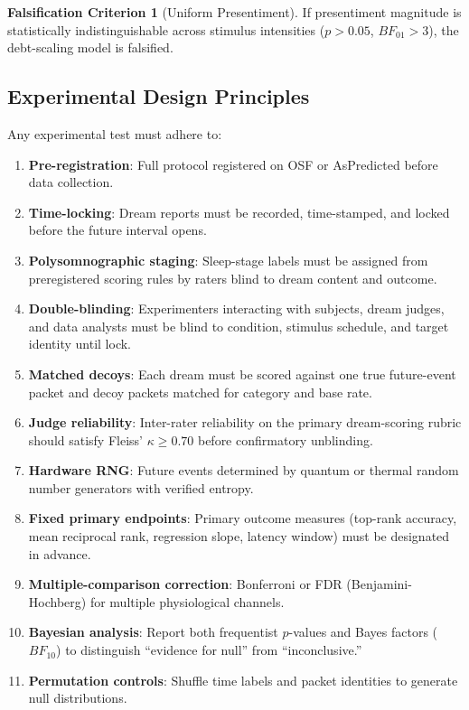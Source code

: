 \documentclass[11pt, a4paper]{article}
\theoremstyle{definition}
\newtheorem{falsifier}[theorem]{Falsification Criterion}
\theoremstyle{remark}
\begin{document}
\begin{falsifier}[Uniform Presentiment]\label{fal:uniform}
If presentiment magnitude is statistically indistinguishable across
stimulus intensities ($p > 0.05$, $BF_{01} > 3$), the debt-scaling
model is falsified.
\end{falsifier}

\subsection{Experimental Design Principles}

Any experimental test must adhere to:
\begin{enumerate}
    \item \textbf{Pre-registration}: Full protocol registered on
    OSF or AsPredicted before data collection.
    \item \textbf{Time-locking}: Dream reports must be recorded,
    time-stamped, and locked before the future interval opens.
    \item \textbf{Polysomnographic staging}: Sleep-stage labels must be
    assigned from preregistered scoring rules by raters blind to dream
    content and outcome.
    \item \textbf{Double-blinding}: Experimenters interacting with
    subjects, dream judges, and data analysts must be blind to
    condition, stimulus schedule, and target identity until lock.
    \item \textbf{Matched decoys}: Each dream must be scored against
    one true future-event packet and decoy packets matched for
    category and base rate.
    \item \textbf{Judge reliability}: Inter-rater reliability on the
    primary dream-scoring rubric should satisfy
    Fleiss' $\kappa \geq 0.70$ before confirmatory unblinding.
    \item \textbf{Hardware RNG}: Future events determined by quantum
    or thermal random number generators with verified entropy.
    \item \textbf{Fixed primary endpoints}: Primary outcome measures
    (top-rank accuracy, mean reciprocal rank, regression slope,
    latency window) must be designated in advance.
    \item \textbf{Multiple-comparison correction}: Bonferroni or
    FDR (Benjamini-Hochberg) for multiple physiological channels.
    \item \textbf{Bayesian analysis}: Report both frequentist
    $p$-values and Bayes factors ($BF_{10}$) to distinguish
    ``evidence for null'' from ``inconclusive.''
    \item \textbf{Permutation controls}: Shuffle time labels and
    packet identities to generate null distributions.
\end{enumerate}
\end{document}
